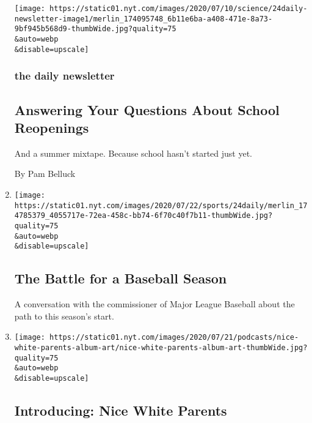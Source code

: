 \begin{enumerate}
  \texttt{[image: https://static01.nyt.com/images/2020/07/10/science/24daily-newsletter-image1/merlin\_174095748\_6b11e6ba-a408-471e-8a73-9bf945b568d9-thumbWide.jpg?quality=75\\\&auto=webp\\\&disable=upscale]}

  \hypertarget{the-daily-newsletter-1}{%
  \subsubsection{the daily newsletter}\label{the-daily-newsletter-1}}

  \hypertarget{answering-your-questions-about-school-reopenings}{%
  \subsection{Answering Your Questions About School
  Reopenings}\label{answering-your-questions-about-school-reopenings}}

  And a summer mixtape. Because school hasn't started just yet.

  By Pam Belluck
\item
  \href{/2020/07/24/podcasts/the-daily/mlb-baseball-season-coronavirus.html}{}

  \texttt{[image: https://static01.nyt.com/images/2020/07/22/sports/24daily/merlin\_174785379\_4055717e-72ea-458c-bb74-6f70c40f7b11-thumbWide.jpg?quality=75\\\&auto=webp\\\&disable=upscale]}

  \hypertarget{the-battle-for-a-baseball-season}{%
  \subsection{The Battle for a Baseball
  Season}\label{the-battle-for-a-baseball-season}}

  A conversation with the commissioner of Major League Baseball about
  the path to this season's start.
\item
  \href{/2020/07/23/podcasts/nice-white-parents-serial.html}{}

  \texttt{[image: https://static01.nyt.com/images/2020/07/21/podcasts/nice-white-parents-album-art/nice-white-parents-album-art-thumbWide.jpg?quality=75\\\&auto=webp\\\&disable=upscale]}

  \hypertarget{introducing-nice-white-parents}{%
  \subsection{Introducing: Nice White
  Parents}\label{introducing-nice-white-parents}}


\end{enumerate}
